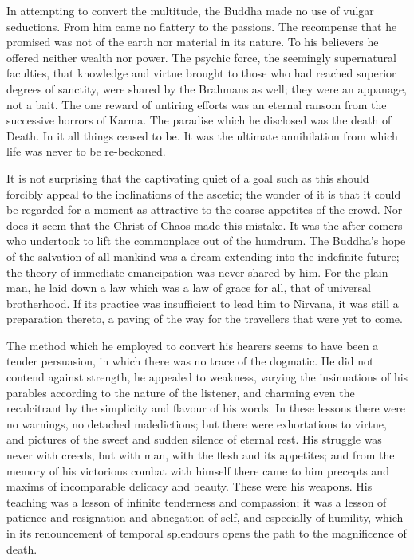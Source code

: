 \documentclass[]{book}
\begin{document}
In attempting to convert the multitude, the Buddha made no use of vulgar
seductions. From him came no flattery to the passions. The recompense
that he promised was not of the earth nor material in its nature. To his
believers he offered neither wealth nor power. The psychic force, the
seemingly supernatural faculties, that knowledge and virtue brought to
those who had reached superior degrees of sanctity, were shared by the
Brahmans as well; they were an appanage, not a bait. The one reward of
untiring efforts was an eternal ransom from the successive horrors of
Karma. The paradise which he disclosed was the death of Death. In it all
things ceased to be. It was the ultimate annihilation from which life
was never to be re-beckoned.

It is not surprising that the captivating quiet of a goal such as this
should forcibly appeal to the inclinations of the ascetic; the wonder of
it is that it could be regarded for a moment as attractive to the coarse
appetites of the crowd. Nor does it seem that the Christ of Chaos made
this mistake. It was the after-comers who undertook to lift the
commonplace out of the humdrum. The Buddha's hope of the salvation of
all mankind was a dream extending into the indefinite future; the theory
of immediate emancipation was never shared by him. For the plain man, he
laid down a law which was a law of grace for all, that of universal
brotherhood. If its practice was insufficient to lead him to Nirvana, it
was still a preparation thereto, a paving of the way for the travellers
that were yet to come.

The method which he employed to convert his hearers seems to have been a
tender persuasion, in which there was no trace of the dogmatic. He did
not contend against strength, he appealed to weakness, varying the
insinuations of his parables according to the nature of the listener,
and charming even the recalcitrant by the simplicity and flavour of his
words. In these lessons there were no warnings, no detached
maledictions; but there were exhortations to virtue, and pictures of the
sweet and sudden silence of eternal rest. His struggle was never with
creeds, but with man, with the flesh and its appetites; and from the
memory of his victorious combat with himself there came to him precepts
and maxims of incomparable delicacy and beauty. These were his weapons.
His teaching was a lesson of infinite tenderness and compassion; it was
a lesson of patience and resignation and abnegation of self, and
especially of humility, which in its renouncement of temporal splendours
opens the path to the magnificence of death.
\end{document}
